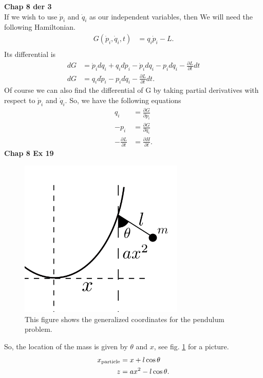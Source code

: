\documentclass[10pt]{article}
\begin{document}
\textbf{Chap 8 der 3}\\
If we wish to use $\dot p_i$ and $\dot q_i$ as our independent variables, then
We will need the following Hamiltonian.
\begin{align*}
  G(\dot p_i, \dot q_i, t) &= q_i\dot p_i -L.\\
\end{align*}
Its differential is
\begin{align*}
  dG &= \dot p_i dq_i + q_id\dot p_i -\dot p_idq_i-p_id\dot q_i-\frac{\partial L}{\partial t}dt\\
  dG &=  q_id\dot p_i -p_id\dot q_i-\frac{\partial L}{\partial t}dt.
\end{align*}
Of course we can also find the differential of G by taking partial derivatives 
with respect to $\dot p_i$ and $\dot q_i$.  So, we have the following equations
\begin{align*}
  q_i &= \frac{\partial G}{\partial\dot p_i}\\
  -p_i &= \frac{\partial G}{\partial\dot q_i}\\
  -\frac{\partial L}{\partial t} &= \frac{\partial H}{\partial t}.
\end{align*}
\textbf{Chap 8 Ex 19}\\
\begin{figure}[h!]
    \centering
    \includegraphics[width=0.7\textwidth]{8-19.png}
    \caption{This figure shows the generalized coordinates for the pendulum problem.}
  \label{fig:8-19}
\end{figure}
So, the location of the mass is given by $\theta$ and $x$, see fig. \ref{fig:8-19} for a picture.
\begin{align*}
  x_{\rm{particle}} &= x+l\cos\theta\\
  z &= ax^2-l\cos\theta.
\end{align*}
\end{document}

